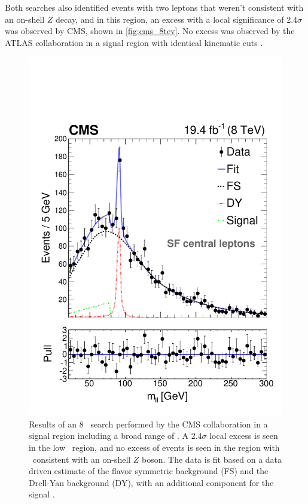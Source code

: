 Both searches also identified events with two leptons that weren't consistent with an on-shell $Z$ decay, and in this region, an excess with a local significance of 2.4$\sigma$ was observed by \ac{CMS}, shown in \autoref{fig:cms_8tev}. No excess was observed by the \ac{ATLAS} collaboration in a signal region with identical kinematic cuts \cite{SUSY-2014-10}. 

\begin{centering}
\begin{figure}[!hbt]
\myfloatalign
\includegraphics[width=.9\linewidth]{figures/theory/H1_FIT_SF_CE.pdf}
\caption{ Results of an 8 \tev~search performed by the \ac{CMS} collaboration in a signal region including a broad range of \mll. A 2.4$\sigma$ local excess is seen in the low \mll~region, and no excess of events is seen in the region with \mll~consistent with an on-shell $Z$ boson. The data is fit based on a data driven estimate of the flavor symmetric background (FS) and the Drell-Yan background (DY), with an additional component for the signal \cite{CMS2}.}
\label{fig:cms_8tev}
\end{figure}
\end{centering}

